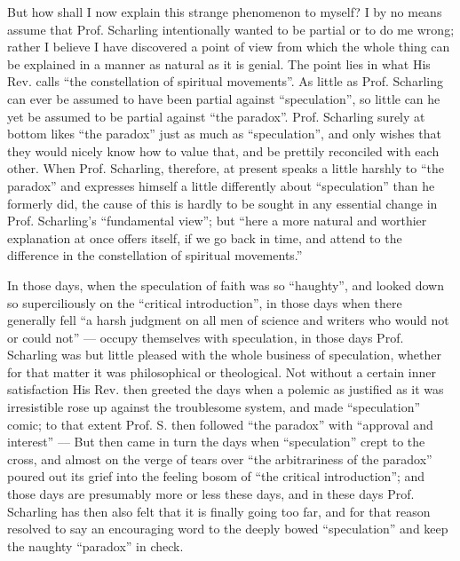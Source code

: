 \documentclass[12pt,a4paper,openany]{book}
\newcommand{\opage}[1]{\marginnote{\footnotesize\textit{[#1]}}}
\begin{document}
But how shall I now explain this strange phenomenon to myself?
I by no means assume that Prof. Scharling intentionally
wanted to be partial or to do me wrong; rather
I believe I have discovered a point of view from which
the whole thing can be explained in a manner as natural as it is
genial. The point lies in what His Rev. calls
``the constellation of spiritual movements''. As little as Prof.
Scharling can ever be assumed to have been partial
against ``speculation'', so little can he yet be assumed
\setcounter{footnote}{0}%
\opage{20}to be partial against ``the paradox''. Prof. Scharling surely
at bottom likes ``the paradox'' just as much as
``speculation'', and only wishes that they would nicely know how to value
that, and be prettily reconciled with each other. When Prof. Scharling,
therefore, at present speaks a little harshly to ``the paradox''
and expresses himself a little differently about ``speculation'' than
he formerly did, the cause of this is hardly to be
sought in any essential change in Prof. Scharling's
``fundamental view''; but ``here a more natural
and worthier explanation at once offers itself, if we go back in time,
and attend to the difference in the constellation of
spiritual movements.''

In those days, when the speculation of faith was so ``haughty'',
and looked down so superciliously on the ``critical introduction'',
in those days when there generally fell ``a harsh
judgment on all men of science and writers who would not
or could not'' --- occupy themselves with speculation,
in those days Prof. Scharling was but little pleased with
the whole business of speculation, whether for that matter it
was philosophical or theological. Not without a certain inner
satisfaction His Rev. then greeted the days when a polemic as
justified as it was irresistible rose up against
the troublesome system, and made ``speculation'' comic;
to that extent Prof. S. then followed ``the paradox'' with ``approval and
interest'' --- But then came in turn the days when ``speculation''
crept to the cross, and almost on the verge of tears over
``the arbitrariness of the paradox'' poured out its grief into the
feeling bosom of ``the critical introduction''; and those days are
presumably more or less these days, and in these days Prof.
Scharling has then also felt that it is finally going too far, and
for that reason resolved to say an encouraging word to the
\setcounter{footnote}{0}%
\opage{21}deeply bowed ``speculation'' and keep the
naughty ``paradox'' in check.
\end{document}
